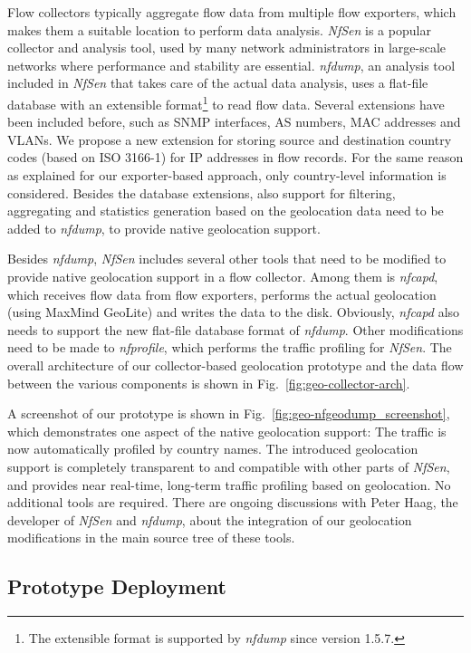 Flow collectors typically aggregate flow data from multiple flow exporters, which makes them a suitable location to perform data analysis. \textit{NfSen} is a popular collector and analysis tool, used by many network administrators in large-scale networks where performance and stability are essential. \textit{nfdump}, an analysis tool included in \textit{NfSen} that takes care of the actual data analysis, uses a flat-file database with an extensible format\footnote{The extensible format is supported by \textit{nfdump} since version 1.5.7.} to read flow data. Several extensions have been included before, such as SNMP interfaces, AS numbers, MAC addresses and VLANs. We propose a new extension for storing source and destination country codes (based on ISO 3166-1) for IP addresses in flow records. For the same reason as explained for our exporter-based approach, only country-level information is considered. Besides the database extensions, also support for filtering, aggregating and statistics generation based on the geolocation data need to be added to \textit{nfdump}, to provide native geolocation support.

Besides \textit{nfdump}, \textit{NfSen} includes several other tools that need to be modified to provide native geolocation support in a flow collector. Among them is \textit{nfcapd}, which receives flow data from flow exporters, performs the actual geolocation (using MaxMind GeoLite) and writes the data to the disk. Obviously, \textit{nfcapd} also needs to support the new flat-file database format of \textit{nfdump}. Other modifications need to be made to \textit{nfprofile}, which performs the traffic profiling for \textit{NfSen}. The overall architecture of our collector-based geolocation prototype and the data flow between the various components is shown in Fig.~\ref{fig:geo-collector-arch}.

A screenshot of our prototype is shown in Fig.~\ref{fig:geo-nfgeodump_screenshot}, which demonstrates one aspect of the native geolocation support: The traffic is now automatically profiled by country names. The introduced geolocation support is completely transparent to and compatible with other parts of \textit{NfSen}, and provides near real-time, long-term traffic profiling based on geolocation. No additional tools are required. There are ongoing discussions with Peter Haag, the developer of \textit{NfSen} and \textit{nfdump}, about the integration of our geolocation modifications in the main source tree of these tools.

\subsection{Prototype Deployment} \label{subsec:geo-prototype_deployment}

